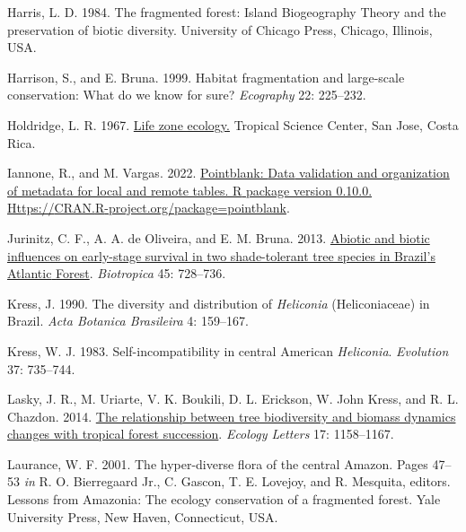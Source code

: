 \documentclass[
  12pt,
  man, donotrepeattitle,floatsintext]{apa6}
\newlength{\cslhangindent}
\newlength{\cslentryspacingunit} %
\newenvironment{CSLReferences}[2] %
 {%
  \setlength{\parindent}{0pt}
  \ifodd #1
  \let\oldpar\par
  \def\par{\hangindent=\cslhangindent\oldpar}
  \fi
  \setlength{\parskip}{#2\cslentryspacingunit}
 }%
 {}
\begin{document}
\begin{CSLReferences}{1}{0}
\leavevmode{}%
Harris, L. D. 1984. The fragmented forest: {Island} {Biogeography} {Theory} and the preservation of biotic diversity. University of Chicago Press, Chicago, Illinois, USA.

\leavevmode{}%
Harrison, S., and E. Bruna. 1999. Habitat fragmentation and large-scale conservation: What do we know for sure? \emph{Ecography} 22: 225--232.

\leavevmode{}%
Holdridge, L. R. 1967. \href{https://www.cabdirect.org/cabdirect/abstract/19670604180}{Life zone ecology.} Tropical Science Center, San Jose, Costa Rica.

\leavevmode{}%
Iannone, R., and M. Vargas. 2022. \href{https://CRAN.R-project.org/package=pointblank}{Pointblank: {Data} validation and organization of metadata for local and remote tables. {R} package version 0.10.0. Https://{CRAN}.{R}-project.org/package=pointblank}.

\leavevmode{}%
Jurinitz, C. F., A. A. de Oliveira, and E. M. Bruna. 2013. \href{https://doi.org/10.1111/btp.12058}{Abiotic and biotic influences on early-stage survival in two shade-tolerant tree species in {Brazil}'s {Atlantic} {Forest}}. \emph{Biotropica} 45: 728--736.

\leavevmode{}%
Kress, J. 1990. The diversity and distribution of \emph{{Heliconia}} ({Heliconiaceae}) in {Brazil}. \emph{Acta Botanica Brasileira} 4: 159--167.

\leavevmode{}%
Kress, W. J. 1983. Self-incompatibility in central {American} \emph{{Heliconia}}. \emph{Evolution} 37: 735--744.

\leavevmode{}%
Lasky, J. R., M. Uriarte, V. K. Boukili, D. L. Erickson, W. John Kress, and R. L. Chazdon. 2014. \href{https://doi.org/10.1111/ele.12322}{The relationship between tree biodiversity and biomass dynamics changes with tropical forest succession}. \emph{Ecology Letters} 17: 1158--1167.

\leavevmode{}%
Laurance, W. F. 2001. The hyper-diverse flora of the central {Amazon}. Pages 47--53 \emph{in} R. O. Bierregaard Jr., C. Gascon, T. E. Lovejoy, and R. Mesquita, editors. Lessons from {Amazonia}: {The} ecology conservation of a fragmented forest. Yale University Press, New Haven, Connecticut, USA.


\end{CSLReferences}
\end{document}
